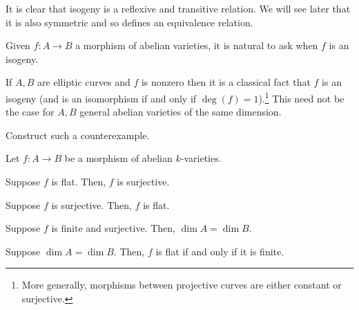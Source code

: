 \documentclass[11pt]{article}
\begin{document}
\begin{remark}
It is clear that isogeny is a reflexive and transitive relation. We will see later that it is also symmetric and so defines an equivalence relation.
\end{remark}

Given $f: A\to B$ a morphism of abelian varieties, it is natural to ask when $f$ is an isogeny.

\begin{example}
If $A,B$ are elliptic curves and $f$ is nonzero then it is a classical fact that $f$ is an isogeny (and is an isomorphism if and only if $\deg(f)=1$).\footnote{More generally, morphisms between projective curves are either constant or surjective.} This need not be the case for $A,B$ general abelian varieties of the same dimension.
\end{example}

\begin{exercise}
Construct such a counterexample.
\end{exercise}

\begin{lemma}\label{isogeny_simplified}
Let $f: A\to B$ be a morphism of abelian $k$-varieties.
\begin{enum}{\alph}
\item Suppose $f$ is flat. Then, $f$ is surjective.
\item Suppose $f$ is surjective. Then, $f$ is flat.
\item Suppose $f$ is finite and surjective. Then, $\dim A=\dim B$.
\item Suppose $\dim A=\dim B$. Then, $f$ is flat if and only if it is finite.
\end{enum}
\end{lemma}
\end{document}
